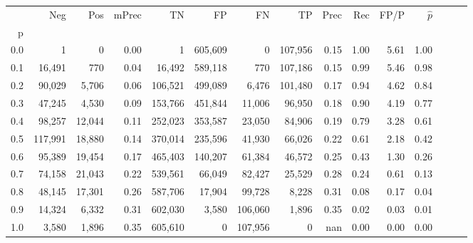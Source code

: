 \begin{tabular}{rrrrrrrrrrrrrrr}
\toprule
{} &      Neg &     Pos & mPrec &       TN &       FP &       FN &       TP &  Prec &   Rec &  FP/P & $\hat{p}$ \\
p   &          &         &       &          &          &          &          &       &       &       &           \\
\midrule
0.0 &        1 &       0 &  0.00 &        1 &  605,609 &        0 &  107,956 &  0.15 &  1.00 &  5.61 &      1.00 \\
0.1 &   16,491 &     770 &  0.04 &   16,492 &  589,118 &      770 &  107,186 &  0.15 &  0.99 &  5.46 &      0.98 \\
0.2 &   90,029 &   5,706 &  0.06 &  106,521 &  499,089 &    6,476 &  101,480 &  0.17 &  0.94 &  4.62 &      0.84 \\
0.3 &   47,245 &   4,530 &  0.09 &  153,766 &  451,844 &   11,006 &   96,950 &  0.18 &  0.90 &  4.19 &      0.77 \\
0.4 &   98,257 &  12,044 &  0.11 &  252,023 &  353,587 &   23,050 &   84,906 &  0.19 &  0.79 &  3.28 &      0.61 \\
0.5 &  117,991 &  18,880 &  0.14 &  370,014 &  235,596 &   41,930 &   66,026 &  0.22 &  0.61 &  2.18 &      0.42 \\
0.6 &   95,389 &  19,454 &  0.17 &  465,403 &  140,207 &   61,384 &   46,572 &  0.25 &  0.43 &  1.30 &      0.26 \\
0.7 &   74,158 &  21,043 &  0.22 &  539,561 &   66,049 &   82,427 &   25,529 &  0.28 &  0.24 &  0.61 &      0.13 \\
0.8 &   48,145 &  17,301 &  0.26 &  587,706 &   17,904 &   99,728 &    8,228 &  0.31 &  0.08 &  0.17 &      0.04 \\
0.9 &   14,324 &   6,332 &  0.31 &  602,030 &    3,580 &  106,060 &    1,896 &  0.35 &  0.02 &  0.03 &      0.01 \\
1.0 &    3,580 &   1,896 &  0.35 &  605,610 &        0 &  107,956 &        0 &   nan &  0.00 &  0.00 &      0.00 \\
\bottomrule
\end{tabular}
